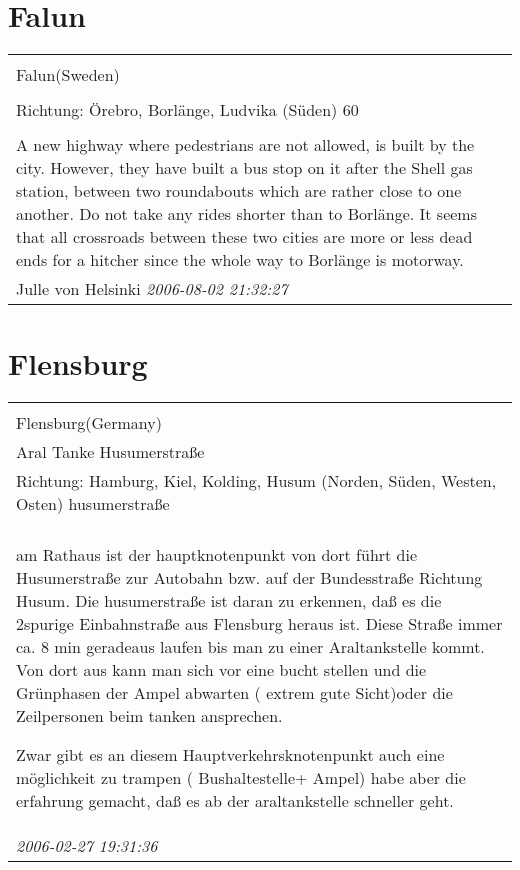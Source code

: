 \documentclass[a4paper,12pt]{article}
\begin{document}
\section{Falun}
\begin{tabular}{|p{13cm}|}
\hline\\
Falun(Sweden)\\
\\
Richtung: Örebro, Borlänge, Ludvika (Süden) 60 \\
\hline\\
A new highway where pedestrians are not allowed, is built by the city. However, they have built a bus stop on it after the Shell gas station, between two roundabouts which are rather close to one another. Do not take any rides shorter than to Borlänge. It seems that all crossroads between these two cities are more or less dead ends for a hitcher since the whole way to Borlänge is motorway. \\
Julle von Helsinki \textit{ 2006-08-02 21:32:27 }\\\hline
\end{tabular}


\section{Flensburg}
\begin{tabular}{|p{13cm}|}
\hline\\
Flensburg(Germany)\\
Aral Tanke Husumerstraße\\
Richtung: Hamburg, Kiel, Kolding, Husum (Norden, Süden, Westen, Osten) husumerstraße \\
\hline\\
am Rathaus ist der hauptknotenpunkt von dort führt die Husumerstraße zur Autobahn bzw. auf der Bundesstraße Richtung Husum.
Die husumerstraße ist daran zu erkennen, daß es die 2spurige Einbahnstraße aus Flensburg heraus ist.
Diese Straße immer ca. 8 min geradeaus laufen bis man zu einer Araltankstelle kommt.
Von dort aus kann man sich vor eine bucht stellen und die Grünphasen der Ampel abwarten ( extrem gute Sicht)oder die Zeilpersonen beim tanken ansprechen.

Zwar gibt es an diesem Hauptverkehrsknotenpunkt auch eine möglichkeit zu trampen ( Bushaltestelle+ Ampel) habe aber die erfahrung gemacht, daß es ab der araltankstelle schneller geht. \\
\textit{ 2006-02-27 19:31:36 }\\\hline
\end{tabular}
\end{document}
